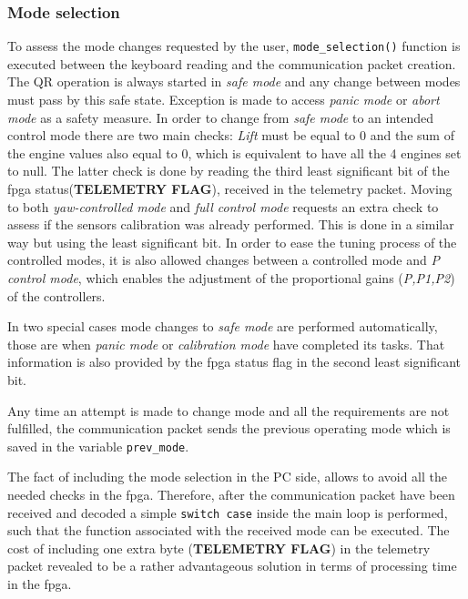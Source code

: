 \documentclass{article}
\begin{document}

\subsubsection{Mode selection}
To assess the mode changes requested by the user, \texttt{mode\_selection()} function is executed between the keyboard reading and the communication packet creation. The QR operation is always started in \textit{safe mode} and any change between modes must pass by this safe state. Exception is made to access \textit{panic mode} or \textit{abort mode} as a safety measure. In order to change from \textit{safe mode} to an intended control mode there are two main checks: \textit{Lift} must be equal to $0$ and the sum of the engine values also equal to $0$, which is equivalent to have all the 4 engines set to null. The latter check is done by reading the third least significant bit of the fpga status(\textbf{TELEMETRY FLAG}), received in the telemetry packet. Moving to both \textit{yaw-controlled mode} and \textit{full control mode}
requests an extra check to assess if the sensors calibration was already performed. This is done in a similar way but using the least significant bit. In order to ease the tuning process of the controlled modes, it is also allowed changes between a controlled mode and \textit{P control mode}, which enables the adjustment of the proportional gains (\textit{P,P1,P2}) of the controllers.

In two special cases mode changes to \textit{safe mode} are performed automatically, those are when \textit{panic mode} or \textit{calibration mode} have completed its tasks. That information is also provided by the fpga status flag in the second least significant bit.

Any time an attempt is made to change mode and all the requirements are not fulfilled, the communication packet sends the previous operating mode which is saved in the variable \texttt{prev\_mode}.

The fact of including the mode selection in the PC side, allows to avoid all the needed checks in the fpga. Therefore, after the communication packet have been received and decoded a simple \texttt{switch case} inside the main loop is performed, such that the function associated with the received mode can be executed. The cost of including one extra byte (\textbf{TELEMETRY FLAG}) in the telemetry packet revealed to be a rather advantageous solution in terms of processing time in the fpga.
\end{document}
